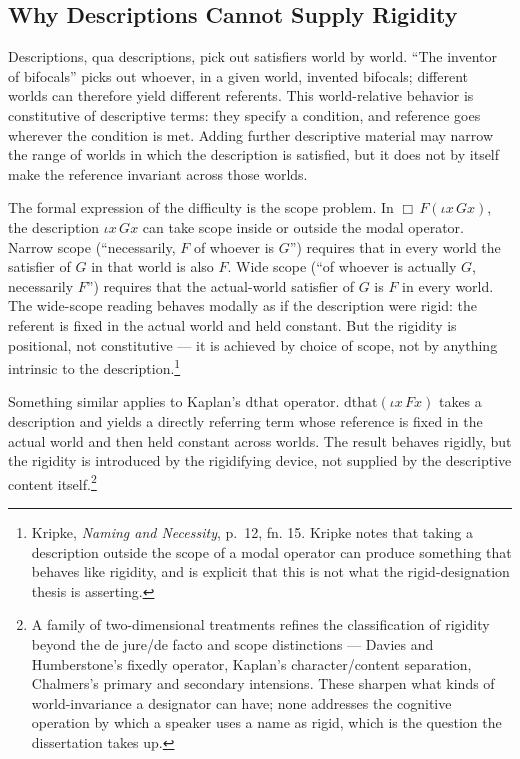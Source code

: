 \documentclass[12pt,a4paper]{article}
\begin{document}
\subsection{Why Descriptions Cannot Supply Rigidity}\label{why-descriptions-cannot-supply-rigidity}

Descriptions, qua descriptions, pick out satisfiers world by world. ``The inventor of bifocals'' picks out whoever, in a given world, invented bifocals; different worlds can therefore yield different referents. This world-relative behavior is constitutive of descriptive terms: they specify a condition, and reference goes wherever the condition is met. Adding further descriptive material may narrow the range of worlds in which the description is satisfied, but it does not by itself make the reference invariant across those worlds.

The formal expression of the difficulty is the scope problem. In \(\Box \, F(\iota x\, G x)\), the description \(\iota x\, G x\) can take scope inside or outside the modal operator. Narrow scope (``necessarily, \(F\) of whoever is \(G\)'') requires that in every world the satisfier of \(G\) in that world is also \(F\). Wide scope (``of whoever is actually \(G\), necessarily \(F\)'') requires that the actual-world satisfier of \(G\) is \(F\) in every world. The wide-scope reading behaves modally as if the description were rigid: the referent is fixed in the actual world and held constant. But the rigidity is positional, not constitutive --- it is achieved by choice of scope, not by anything intrinsic to the description.\footnote{Kripke, \emph{Naming and Necessity}, p.~12, fn. 15. Kripke notes that taking a description outside the scope of a modal operator can produce something that behaves like rigidity, and is explicit that this is not what the rigid-designation thesis is asserting.}

Something similar applies to Kaplan's \(\text{dthat}\) operator. \(\text{dthat}(\iota x\, F x)\) takes a description and yields a directly referring term whose reference is fixed in the actual world and then held constant across worlds. The result behaves rigidly, but the rigidity is introduced by the rigidifying device, not supplied by the descriptive content itself.\footnote{A family of two-dimensional treatments refines the classification of rigidity beyond the de jure/de facto and scope distinctions --- Davies and Humberstone's fixedly operator, Kaplan's character/content separation, Chalmers's primary and secondary intensions. These sharpen what kinds of world-invariance a designator can have; none addresses the cognitive operation by which a speaker uses a name as rigid, which is the question the dissertation takes up.}
\end{document}
